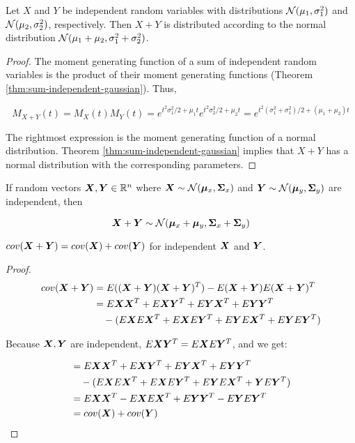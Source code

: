 \begin{thm}
    Let $X$ and $Y$ be independent random variables with distributions ${\mathcal{N}}(\mu_1, \sigma_1^2)$ and ${\mathcal{N}}(\mu_2, \sigma_2^2)$, respectively. Then $X + Y$ is distributed according to the normal distribution ${\mathcal{N}}(\mu_1 + \mu_2, \sigma_1^2 + \sigma_2^2)$.
    
    \begin{proof}
    The moment generating function of a sum of independent random variables is the product of their moment generating functions (Theorem \ref{thm:sum-independent-gaussian}). Thus,
    
    \begin{equation}
    M_{X + Y}(t) = M_X(t) M_Y(t) = e^{t^2 \sigma_1^2 / 2 + \mu_1 t} e^{t^2 \sigma_2^2 / 2 + \mu_2 t} = e^{t^2 (\sigma_1^2 + \sigma_1^2) / 2 + (\mu_1 + \mu_2) t}
    \end{equation}
    
    The rightmost expression is the moment generating function of a normal distribution. Theorem \ref{thm:sum-independent-gaussian} implies that $X + Y$ has a normal distribution with the corresponding parameters. 
    \end{proof}
\end{thm}

\begin{thm}
    If random vectors ${\bm{X}}, {\bm{Y}} \in {\mathbb{R}}^n$ where ${\bm{X}} \sim {\mathcal{N}}({\bm{\mu}}_x, {\bm{\Sigma}}_x)$ and ${\bm{Y}} \sim {\mathcal{N}}({\bm{\mu}}_y, {\bm{\Sigma}}_y)$ are independent, then
    
    \begin{equation}
        {\bm{X}} + {\bm{Y}} \sim {\mathcal{N}}({\bm{\mu}}_x + {\bm{\mu}}_y, {\bm{\Sigma}}_x + {\bm{\Sigma}}_y)
    \end{equation}
\end{thm}

\begin{thm}
    $cov({\bm{X}} + {\bm{Y}}) = cov({\bm{X}}) + cov({\bm{Y}})$ for independent ${\bm{X}}$ and ${\bm{Y}}$.

    \begin{proof}
    \begin{align}
        cov({\bm{X}} + {\bm{Y}}) &= E(({\bm{X}} + {\bm{Y}}) ({\bm{X}} + {\bm{Y}})^T) - E({\bm{X}} + {\bm{Y}})E({\bm{X}} + {\bm{Y}})^T \\
        &= E{\bm{X}}{\bm{X}}^T + E{\bm{X}}{\bm{Y}}^T + E{\bm{Y}}{\bm{X}}^T + E{\bm{Y}}{\bm{Y}}^T \\
          &\quad - (E{\bm{X}} E{\bm{X}}^T + E{\bm{X}} E{\bm{Y}}^T + E{\bm{Y}} E{\bm{X}}^T + E {\bm{Y}} E{\bm{Y}}^T)
    \end{align}
    
    Because ${\bm{X}}, {\bm{Y}}$ are independent, $E {\bm{X}} {\bm{Y}}^T = E {\bm{X}} E {\bm{Y}}^T$, and we get:
    
    \begin{align}
        &= E{\bm{X}}{\bm{X}}^T + E{\bm{X}} {\bm{Y}}^T + E{\bm{Y}}{\bm{X}}^T + E{\bm{Y}}{\bm{Y}}^T \\
          &\quad - (E{\bm{X}} E{\bm{X}}^T + E{\bm{X}} E{\bm{Y}}^T + E{\bm{Y}} E{\bm{X}}^T + {\bm{Y}} E{\bm{Y}}^T) \\
        &= E{\bm{X}}{\bm{X}}^T - E{\bm{X}} E{\bm{X}}^T + E{\bm{Y}} {\bm{Y}}^T - E{\bm{Y}} E{\bm{Y}}^T \\
        &= cov({\bm{X}}) + cov({\bm{Y}})
    \end{align}
    \end{proof}
\end{thm}
    
